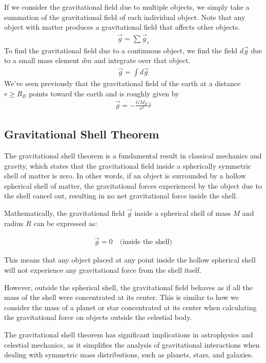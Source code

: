 \documentclass[11pt]{article}
\begin{document}
If we consider the gravitational field due to multiple objects, we simply take a summation of the gravitational field of each individual object. Note that any object with matter produces a gravitational field that affects other objects.
\begin{align*}
    \Vec{g} = \sum \Vec{g}_i
\end{align*}
To find the gravitational field due to a continuous object, we find the field $d\Vec{g}$ due to a small mass element $dm$ and integrate over that object.
\begin{align*}
    \Vec{g} = \int d\Vec{g}
\end{align*}
We've seen previously that the gravitational field of the earth at a distance $r \geq R_E$ points toward the earth and is roughly given by 
\begin{align*}
    \Vec{g} = - \frac{GM_E}{r^2}\hat{r}
\end{align*}

\subsection{Gravitational Shell Theorem}

The gravitational shell theorem is a fundamental result in classical mechanics and gravity, which states that the gravitational field inside a spherically symmetric shell of matter is zero. In other words, if an object is surrounded by a hollow spherical shell of matter, the gravitational forces experienced by the object due to the shell cancel out, resulting in no net gravitational force inside the shell.

Mathematically, the gravitational field $\Vec{g}$ inside a spherical shell of mass $M$ and radius $R$ can be expressed as:

\begin{align*}
    \Vec{g} = 0 \quad \text{(inside the shell)}
\end{align*}

This means that any object placed at any point inside the hollow spherical shell will not experience any gravitational force from the shell itself.

However, outside the spherical shell, the gravitational field behaves as if all the mass of the shell were concentrated at its center. This is similar to how we consider the mass of a planet or star concentrated at its center when calculating the gravitational force on objects outside the celestial body.

The gravitational shell theorem has significant implications in astrophysics and celestial mechanics, as it simplifies the analysis of gravitational interactions when dealing with symmetric mass distributions, such as planets, stars, and galaxies.
\end{document}
